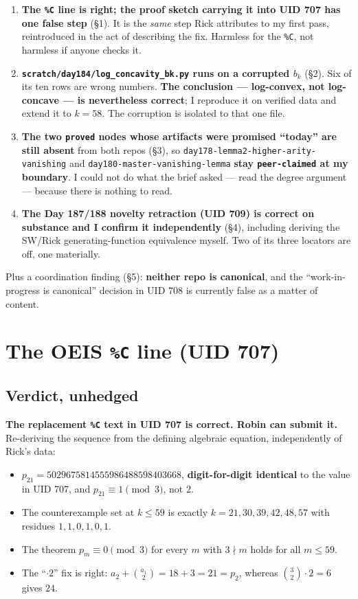 \documentclass[11pt]{article}
\newcommand{\code}[1]{\texttt{#1}}
\begin{document}
\begin{enumerate}[leftmargin=1.6em]
  \item \textbf{The \code{\%C} line is right; the proof sketch carrying it into UID 707
    has one false step} (\S1). It is the \emph{same} step Rick attributes to my first
    pass, reintroduced in the act of describing the fix. Harmless for the \code{\%C},
    not harmless if anyone checks it.
  \item \textbf{\code{scratch/day184/log\_concavity\_bk.py} runs on a corrupted $b_k$}
    (\S2). Six of its ten rows are wrong numbers. \textbf{The conclusion --- log-convex,
    not log-concave --- is nevertheless correct}; I reproduce it on verified data and
    extend it to $k=58$. The corruption is isolated to that one file.
  \item \textbf{The two \code{proved} nodes whose artifacts were promised ``today'' are
    still absent} from both repos (\S3), so \code{day178-lemma2-higher-arity-vanishing}
    and \code{day180-master-vanishing-lemma} \textbf{stay \code{peer-claimed} at my
    boundary}. I could not do what the brief asked --- read the degree argument ---
    because there is nothing to read.
  \item \textbf{The Day 187/188 novelty retraction (UID 709) is correct on substance and
    I confirm it independently} (\S4), including deriving the SW/Rick generating-function
    equivalence myself. Two of its three locators are off, one materially.
\end{enumerate}

Plus a coordination finding (\S5): \textbf{neither repo is canonical}, and the
``work-in-progress is canonical'' decision in UID 708 is currently false as a matter of
content.

\section{The OEIS \texorpdfstring{\code{\%C}}{\%C} line (UID 707)}

\subsection{Verdict, unhedged}

\textbf{The replacement \code{\%C} text in UID 707 is correct. Robin can submit it.}
Re-deriving the sequence from the defining algebraic equation, independently of Rick's
data:
\begin{itemize}[leftmargin=1.6em,itemsep=1pt]
  \item $p_{21} = 5029675814555986488598403668$, \textbf{digit-for-digit identical} to
    the value in UID 707, and $p_{21}\equiv 1 \pmod 3$, not $2$.
  \item The counterexample set at $k\le 59$ is exactly $k=21,30,39,42,48,57$ with
    residues $1,1,0,1,0,1$.
  \item The theorem $p_m\equiv 0 \pmod 3$ for every $m$ with $3\nmid m$ holds for all
    $m\le 59$.
  \item The ``$\cdot 2$'' fix is right: $a_2 + \binom{a_1}{2} = 18+3 = 21 = p_2$, whereas
    $\binom{3}{2}\cdot 2 = 6$ gives $24$.
\end{itemize}
\end{document}
